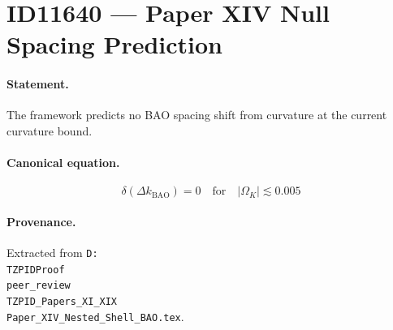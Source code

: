 \section*{ID11640 --- Paper XIV Null Spacing Prediction}

\paragraph{Statement.}
The framework predicts no BAO spacing shift from curvature at the current curvature bound.

\paragraph{Canonical equation.}
\[
\delta(\Delta k_{\mathrm{BAO}})=0\quad\mathrm{for}\quad|\Omega_K|\lesssim0.005
\]

\paragraph{Provenance.}
Extracted from \texttt{D:\\TZPIDProof\\peer\_review\\TZPID\_Papers\_XI\_XIX\\Paper\_XIV\_Nested\_Shell\_BAO.tex}.
